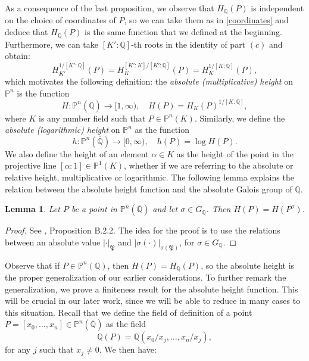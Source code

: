 \documentclass[a4paper, 12pt]{amsart}
\theoremstyle{definition}
\theoremstyle{plain}
\theoremstyle{plain}
\theoremstyle{plain}
\newtheorem{lemma0}[defn0]{Lemma}
\theoremstyle{plain}
\theoremstyle{remark}
\theoremstyle{remark}
\theoremstyle{plain}
\newenvironment{lemma}{ \begin{lemma0}}{\end{lemma0}}
\newcommand{\Q}{\mathbb{Q}}
\renewcommand{\P}{\mathfrak{P}}
\begin{document}
	As a consequence of the last proposition, we observe that $H_\Q(P)$ is independent on the choice of coordinates of $P$, so we can take them as in \eqref{coordinates} and deduce that $H_\Q(P)$ is the same function that we defined at the beginning. Furthermore, we can take $[K':\Q]$-th roots in the identity of part $(c)$ and obtain:
	\begin{equation*}
		H_{K'}^{1/[K':\Q]}(P)=H_{K}^{[K':K]/[K':\Q]}(P)=H_K^{1/[K:\Q]}(P),
	\end{equation*}
	which motivates the following definition: the \emph{absolute (multiplicative) height} on $\mathbb{P}^n$ is the function
	\begin{equation*}
		H:\mathbb{P}^n(\overline{\Q})\rightarrow[1,\infty),\quad H(P)=H_K(P)^{1/[K:\Q]},
	\end{equation*}
	where $K$ is any number field such that $P\in\mathbb{P}^n(K)$. Similarly, we define the \emph{absolute (logarithmic) height} on $\mathbb{P}^n$ as the function
	\begin{equation*}
		h:\mathbb{P}^n(\overline{\Q})\rightarrow[0,\infty),\quad h(P)=\log H(P).
	\end{equation*}
	We also define the height of an element $\alpha\in K$ as the height of the point in the projective line $[\alpha:1]\in\mathbb{P}^1(K)$, whether if we are referring to the absolute or relative height, multiplicative or logarithmic. The following lemma explains the relation between the absolute height function and the absolute Galois group of $\Q$.
	
	\begin{lemma}\label{heightgalois}
		Let $P$ be a point in $\mathbb{P}^n(\overline{\Q})$ and let $\sigma\in G_\Q$. Then $H(P)=H(P^\sigma)$.
	\end{lemma}
	\begin{proof}
		See \cite{Hindry_Silverman_2000}, Proposition B.2.2. The idea for the proof is to use the relations between an absolute value $|\cdot|_\P$ and $|\sigma(\cdot)|_{\sigma(\P)}$, for $\sigma\in G_\Q$.
	\end{proof}
	
	Observe that if $P\in\mathbb{P}^n(\Q)$, then $H(P)=H_\Q(P)$, so the absolute height is the proper generalization of our earlier considerations. To further remark the generalization, we prove a finiteness result for the absolute height function. This will be crucial in our later work, since we will be able to reduce in many cases to this situation. Recall that we define the field of definition of a point $P=[x_0,\ldots,x_n]\in\mathbb{P}^n(\overline{\Q})$ as the field
	\begin{equation*}
		\Q(P)=\Q(x_0/x_j,\ldots,x_n/x_j),
	\end{equation*}
	for any $j$ such that $x_j\neq 0$. We then have:
	
\end{document}
